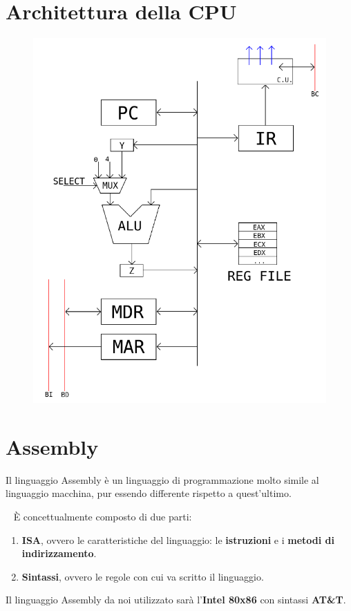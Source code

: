 \documentclass[a4paper,11pt,oneside]{book}
\begin{document}
\section{Architettura della CPU}
\begin{figure}[h]
    \centering
    \includegraphics[scale=0.6]{modello_architettura_cpu}
\end{figure}

\section{Assembly}
Il linguaggio Assembly è un linguaggio di programmazione molto simile al linguaggio macchina, pur essendo differente rispetto a quest'ultimo.

~\newline
È concettualmente composto di due parti:
\begin{enumerate}
    \item \textbf{ISA}, ovvero le caratteristiche del linguaggio: le \textbf{istruzioni} e i \textbf{metodi di indirizzamento}.
    \item \textbf{Sintassi}, ovvero le regole con cui va scritto il linguaggio.
\end{enumerate}
Il linguaggio Assembly da noi utilizzato sarà l'\textbf{Intel 80x86} con sintassi \textbf{AT\&T}.
\end{document}
